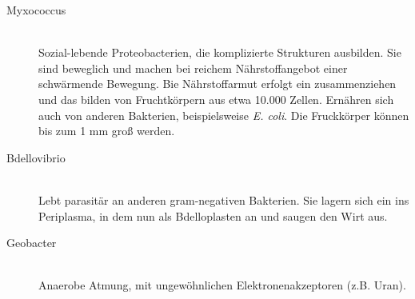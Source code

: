 \begin{enumerate}
		\begin{description} 
			\item[Myxococcus] \hfill \\
				Sozial-lebende Proteobacterien, die komplizierte Strukturen ausbilden.
				Sie sind beweglich und machen bei reichem Nährstoffangebot einer schwärmende Bewegung.
				Bie Nährstoffarmut erfolgt ein zusammenziehen und das bilden von Fruchtkörpern aus etwa 10.000 Zellen.
				Ernähren sich auch von anderen Bakterien, beispielsweise \emph{E. coli}.
				Die Fruckkörper können bis zum 1 mm  groß werden.
			\item[Bdellovibrio] \hfill \\
				Lebt parasitär an anderen gram-negativen Bakterien.
				Sie lagern sich ein ins Periplasma,
				in dem nun als Bdelloplasten an und saugen den Wirt aus.
			\item[Geobacter] \hfill \\
				Anaerobe Atmung, mit ungewöhnlichen Elektronenakzeptoren (z.B. Uran).
		\end{description}

\end{enumerate}

